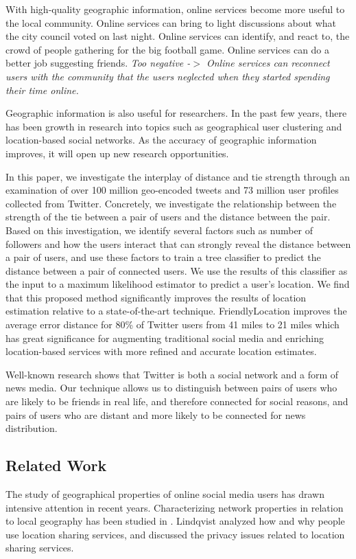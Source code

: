 \documentclass[letterpaper]{article}
\newcommand{\jam}[1]{\emph{#1}}
\newcommand{\flsec}[1]{\subsection{#1}}
\begin{document}
With high-quality geographic information, online services become more useful to
the local community.
%
Online services can bring to light discussions about what the city council
voted on last night.
%
Online services can identify, and react to, the crowd of people gathering for
the big football game.
%
Online services can do a better job suggesting friends.
%
\jam{Too negative -$>$
Online services can reconnect users with the community that the users neglected
when they started spending their time online.
}

Geographic information is also useful for researchers.
%
In the past few years, there has been growth in research into topics such as
geographical user clustering and location-based social networks.
%
As the accuracy of geographic information improves, it will open up new
research opportunities.

In this paper, we investigate the interplay of distance and tie strength
through an examination of over 100 million geo-encoded tweets and 73 million
user profiles collected from Twitter.
%
Concretely, we investigate the relationship between the strength of the tie
between a pair of users and the distance between the pair.
%
Based on this investigation, we identify several factors such as number of
followers and how the users interact that can strongly reveal the distance
between a pair of users, and use these factors to train a tree classifier to
predict the distance between a pair of connected users.
%
We use the results of this classifier as the input to a maximum likelihood
estimator to predict a user's location.
%
We find that this proposed method significantly improves the results of
location estimation relative to a state-of-the-art technique.
%
FriendlyLocation improves the average error distance for 80\% of Twitter users
from 41 miles to 21 miles which has great significance for augmenting
traditional social media and enriching location-based services with more
refined and accurate location estimates.

Well-known research \cite{kwak2010why} shows that Twitter is both a social
network and a form of news media.
%
Our technique allows us to distinguish between pairs of users who are likely
to be friends in real life, and therefore connected for social reasons, and
pairs of users who are distant and more likely to be connected for news
distribution.


\flsec{Related Work}

The study of geographical properties of online social media users has drawn
intensive attention in recent years.  Characterizing network properties in
relation to local geography has been studied in \cite{yardi2010tweeting}.
Lindqvist \cite{lindqvist2011m} analyzed how and why people use location
sharing services, and discussed the privacy issues related to location sharing
services.
\end{document}
